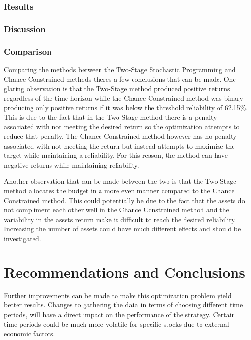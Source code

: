 \documentclass[12pt]{article}
\begin{document}
\subsubsection{Results}

\subsubsection{Discussion}

\subsubsection{Comparison}
Comparing the methods between the Two-Stage Stochastic Programming and Chance Constrained methods theres a few conclusions that can be made. One glaring observation is that the Two-Stage method produced positive returns regardless of the time horizon while the Chance Constrained method was binary producing only positive returns if it was below the threshold reliability of 62.15\%. This is due to the fact that in the Two-Stage method there is a penalty associated with not meeting the desired return so the optimization attempts to reduce that penalty. The Chance Constrained method however has no penalty associated with not meeting the return but instead attempts to maximize the target while maintaining a reliability. For this reason, the method can have negative returns while maintaining reliability.

    Another observation that can be made between the two is that the Two-Stage method allocates the budget in a more even manner compared to the Chance Constrained method. This could potentially be due to the fact that the assets do not compliment each other well in the Chance Constrained method and the variability in the assets return make it difficult to reach the desired reliability. Increasing the number of assets could have much different effects and should be investigated. 


\section{Recommendations and Conclusions}
Further improvements can be made to make this optimization problem yield better results. Changes to gathering the data in terms of choosing different time periods, will have a direct impact on the performance of the strategy. Certain time periods could be much more volatile for specific stocks due to external economic factors. 
\end{document}
